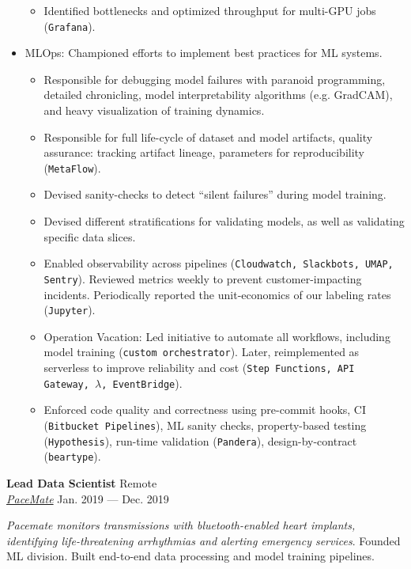 \documentclass[a4paper,12pt]{article}
\newcommand{\ressubheading}[4]{{\begin{minipage}{\textwidth}
                                    \textbf{#1} \hfill #2 \\
                                    \textit{#3} \hfill #4 \\
\end{minipage}}}
\begin{document}
\begin{itemize}
\begin{itemize}
            \item Identified bottlenecks and optimized throughput for multi-GPU jobs (\texttt{Grafana}).
        \end{itemize}
        \item MLOps: Championed efforts to implement best practices for ML systems.
        \begin{itemize}
            \item Responsible for debugging model failures with paranoid programming, detailed chronicling, model interpretability algorithms (e.g. GradCAM),  and heavy visualization of training dynamics.
            \item Responsible for full life-cycle of dataset and model artifacts, quality assurance:
            tracking artifact lineage, parameters for reproducibility (\texttt{MetaFlow}).
            \item Devised sanity-checks to detect ``silent failures'' during model training. 
            \item Devised different stratifications for validating models, as well as validating specific data slices. 
            \item Enabled observability across pipelines (\texttt{Cloudwatch, Slackbots, UMAP, Sentry}). Reviewed metrics weekly to prevent customer-impacting incidents. Periodically reported the unit-economics of our labeling rates (\texttt{Jupyter}).
            \item Operation Vacation: Led initiative to automate all workflows, including model training (\texttt{custom orchestrator}). Later, reimplemented as serverless to improve reliability and cost (\texttt{Step Functions, API Gateway, $\lambda$, EventBridge}).
            \item Enforced code quality and correctness using pre-commit hooks, CI (\texttt{Bitbucket Pipelines}), ML sanity checks, property-based testing (\texttt{Hypothesis}), run-time validation (\texttt{Pandera}), design-by-contract (\texttt{beartype}).
        \end{itemize}

    \end{itemize}


    \ressubheading{Lead Data Scientist}{Remote}{\href{https://pacemate.com/}{PaceMate}}{Jan. 2019 --- Dec. 2019}

    \vspace{-6pt} \textit{Pacemate monitors transmissions with bluetooth-enabled heart implants, identifying life-threatening arrhythmias and alerting emergency services}. Founded ML division. Built end-to-end data processing and model training pipelines.
\end{document}
